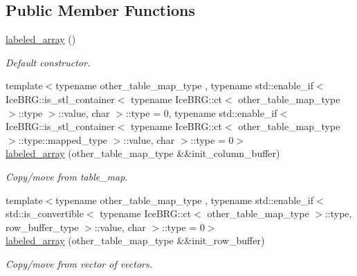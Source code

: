 \subsection*{Public Member Functions}
\begin{DoxyCompactItemize}
\item 
\hyperlink{classIceBRG_1_1labeled__array_a952ad3beb41665e96521d7ec6ccf5315}{labeled\+\_\+array} ()
\begin{DoxyCompactList}\small\item\em Default constructor. \end{DoxyCompactList}\item 
{\footnotesize template$<$typename other\+\_\+table\+\_\+map\+\_\+type , typename std\+::enable\+\_\+if$<$ Ice\+B\+R\+G\+::is\+\_\+stl\+\_\+container$<$ typename Ice\+B\+R\+G\+::ct$<$ other\+\_\+table\+\_\+map\+\_\+type $>$\+::type $>$\+::value, char $>$\+::type  = 0, typename std\+::enable\+\_\+if$<$ Ice\+B\+R\+G\+::is\+\_\+stl\+\_\+container$<$ typename Ice\+B\+R\+G\+::ct$<$ other\+\_\+table\+\_\+map\+\_\+type $>$\+::type\+::mapped\+\_\+type $>$\+::value, char $>$\+::type  = 0$>$ }\\\hyperlink{classIceBRG_1_1labeled__array_aa2f6fc1c2ea98136855e2e513ce97cf2}{labeled\+\_\+array} (other\+\_\+table\+\_\+map\+\_\+type \&\&init\+\_\+column\+\_\+buffer)
\begin{DoxyCompactList}\small\item\em Copy/move from table\+\_\+map. \end{DoxyCompactList}\item 
{\footnotesize template$<$typename other\+\_\+table\+\_\+map\+\_\+type , typename std\+::enable\+\_\+if$<$ std\+::is\+\_\+convertible$<$ typename Ice\+B\+R\+G\+::ct$<$ other\+\_\+table\+\_\+map\+\_\+type $>$\+::type, row\+\_\+buffer\+\_\+type $>$\+::value, char $>$\+::type  = 0$>$ }\\\hyperlink{classIceBRG_1_1labeled__array_a0c950a3512b1ada5b8e2fa5464847153}{labeled\+\_\+array} (other\+\_\+table\+\_\+map\+\_\+type \&\&init\+\_\+row\+\_\+buffer)
\begin{DoxyCompactList}\small\item\em Copy/move from vector of vectors. \end{DoxyCompactList}\item 

\end{DoxyCompactItemize}
